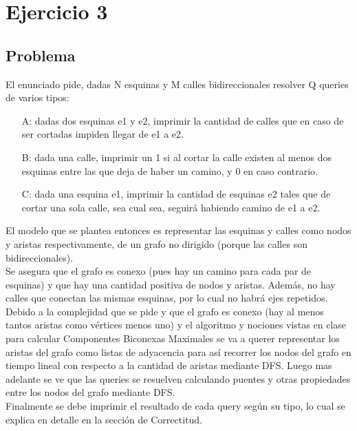 \section{Ejercicio 3}

\subsection{Problema}

El enunciado pide, dadas N esquinas y M calles bidireccionales resolver Q queries de varios tipos:
\begin{itemize}
	\item[A: ] dadas dos esquinas e1 y e2, imprimir la cantidad de calles que en caso de ser cortadas impiden llegar de e1 a e2.
	\item[B: ] dada una calle, imprimir un 1 si al cortar la calle existen al menos dos esquinas entre las que deja de haber un camino, y 0 en caso contrario.
	\item[C: ] dada una esquina e1, imprimir la cantidad de esquinas e2 tales que de cortar una sola calle, sea cual sea, seguir\'a habiendo camino de e1 a e2.
\end{itemize}

El modelo que se plantea entonces es representar las esquinas y calles como nodos y aristas respectivamente, de un grafo no dirigido
(porque las calles son bidireccionales).\\

Se asegura que el grafo es conexo (pues hay un camino para cada par de esquinas) y que hay una cantidad positiva de nodos y aristas.
Además, no hay calles que conectan las mismas esquinas, por lo cual no habrá ejes repetidos. \\

Debido a la complejidad que se pide y que el grafo es conexo (hay al menos tantos aristas como vértices menos uno) y el algoritmo y nociones
vistas en clase para calcular Componentes Biconexas Maximales se va a querer representar los aristas del grafo como listas de adyacencia para as\'i 
recorrer los nodos del grafo en tiempo lineal con respecto a la cantidad de aristas mediante DFS. Luego mas adelante se ve que las queries se resuelven
calculando puentes y otras propiedades entre los nodos del grafo mediante DFS. \\

Finalmente se debe imprimir el resultado de cada query seg\'un su tipo, lo cual se explica en detalle en la sección de Correctitud. \\

